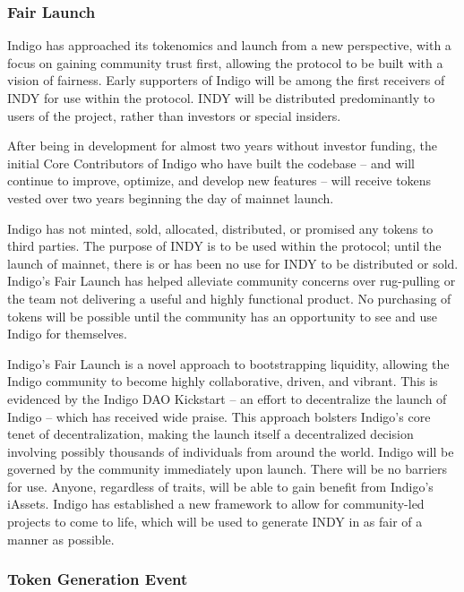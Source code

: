 \documentclass{article}
\begin{document}
\begin{sloppypar}
\filbreak

\hypertarget{fair-launch}{%
\subsubsection{Fair Launch}\label{fair-launch}}

Indigo has approached its tokenomics and launch from a new perspective,
with a focus on gaining community trust first, allowing the protocol to
be built with a vision of fairness. Early supporters of Indigo will be
among the first receivers of INDY for use within the protocol. INDY will
be distributed predominantly to users of the project, rather than
investors or special insiders.

After being in development for almost two years without investor
funding, the initial Core Contributors of Indigo who have built the
codebase -- and will continue to improve, optimize, and develop new
features -- will receive tokens vested over two years beginning the day
of mainnet launch.

Indigo has not minted, sold, allocated, distributed, or promised any
tokens to third parties. The purpose of INDY is to be used within the
protocol; until the launch of mainnet, there is or has been no use for
INDY to be distributed or sold. Indigo's Fair Launch has helped
alleviate community concerns over rug-pulling or the team not delivering
a useful and highly functional product. No purchasing of tokens will be
possible until the community has an opportunity to see and use Indigo
for themselves.

Indigo's Fair Launch is a novel approach to bootstrapping liquidity,
allowing the Indigo community to become highly collaborative, driven,
and vibrant. This is evidenced by the Indigo DAO Kickstart -- an effort
to decentralize the launch of Indigo -- which has received wide praise.
This approach bolsters Indigo's core tenet of decentralization, making
the launch itself a decentralized decision involving possibly thousands
of individuals from around the world. Indigo will be governed by the
community immediately upon launch. There will be no barriers for use.
Anyone, regardless of traits, will be able to gain benefit from Indigo's
iAssets. Indigo has established a new framework to allow for
community-led projects to come to life, which will be used to generate
INDY in as fair of a manner as possible.

\hypertarget{token-generation-event}{%
\subsubsection{Token Generation Event}\label{token-generation-event}}


\end{sloppypar}
\end{document}
